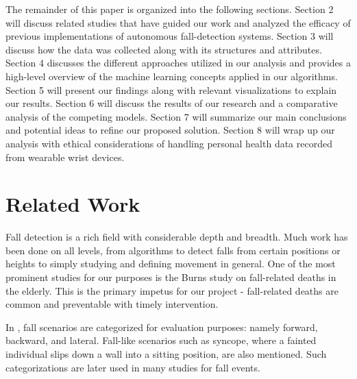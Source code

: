 \documentclass{llncs}
\begin{document}
	The remainder of this paper is organized into the following sections. Section 2 will discuss related studies that have guided our work and analyzed the efficacy of previous implementations of autonomous fall-detection systems. Section 3 will discuss how the data was collected along with its structures and attributes. Section 4 discusses the different approaches utilized in our analysis and provides a high-level overview of the machine learning concepts applied in our algorithms. Section 5 will present our findings along with relevant visualizations to explain our results. Section 6 will discuss the results of our research and a comparative analysis of the competing models. Section 7 will summarize our main conclusions and potential ideas to refine our proposed solution. Section 8 will wrap up our analysis with ethical considerations of handling personal health data recorded from wearable wrist devices.

\section{Related Work}
 
Fall detection is a rich field with considerable depth and breadth. Much work has been done on all levels, from algorithms to detect falls from certain positions or heights to simply studying and defining movement in general. One of the most prominent studies for our purposes is the Burns study on fall-related deaths in the elderly. \cite{burns2018deaths} This is the primary impetus for our project - fall-related deaths are common and preventable with timely intervention.
    
    In \cite{noury2007principles}, fall scenarios are categorized for evaluation purposes: namely forward, backward, and lateral. Fall-like scenarios such as syncope, where a fainted individual slips down a wall into a sitting position, are also mentioned. Such categorizations are later used in many studies for fall events.
     
\end{document}
